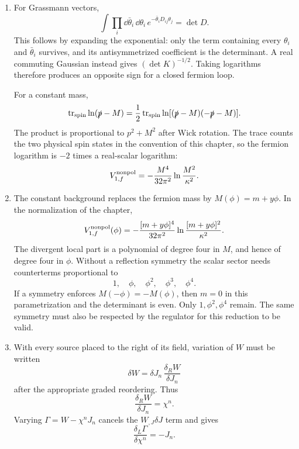 \begin{enumerate}
  \begin{enumerate}
    \item[(a)]
    For Grassmann vectors,
    \[
      \int\prod_i \dd\bar\theta_i\,\dd\theta_i\,
        e^{-\bar\theta_iD_{ij}\theta_j}=\det D.
    \]
    This follows by expanding the exponential: only the term containing
    every \(\theta_i\) and \(\bar\theta_i\) survives, and its antisymmetrized
    coefficient is the determinant.  A real commuting Gaussian instead
    gives \((\det K)^{-1/2}\).  Taking logarithms therefore produces an
    opposite sign for a closed fermion loop.

    For a constant mass,
    \[
      \operatorname{tr}_{\rm spin}\ln(\slashed p-M)
        =\frac12\operatorname{tr}_{\rm spin}
          \ln[(\slashed p-M)(-\slashed p-M)].
    \]
    The product is proportional to \(p^2+M^2\) after Wick rotation.  The
    trace counts the two physical spin states in the convention of this
    chapter, so the fermion logarithm is \(-2\) times a real-scalar
    logarithm:
    \[
      V_{1,f}^{\rm nonpol}
        =-\frac{M^4}{32\pi^2}\ln\frac{M^2}{\kappa^2}.
    \]
    \item[(b)]
    The constant background replaces the fermion mass by
    \(M(\phi)=m+y\phi\).  In the normalization of the chapter,
    \[
      V_{1,f}^{\rm nonpol}(\phi)
        =-\frac{[m+y\phi]^4}{32\pi^2}
          \ln\frac{[m+y\phi]^2}{\kappa^2}.
    \]
    The divergent local part is a polynomial of degree four in \(M\), and
    hence of degree four in \(\phi\).  Without a reflection symmetry the
    scalar sector needs counterterms proportional to
    \[
      1,\quad\phi,\quad\phi^2,\quad\phi^3,\quad\phi^4.
    \]
    If a symmetry enforces \(M(-\phi)=-M(\phi)\), then \(m=0\) in this
    parametrization and the determinant is even.  Only
    \(1,\phi^2,\phi^4\) remain.  The same symmetry must also be respected by
    the regulator for this reduction to be valid.
    \item[(c)]
    With every source placed to the right of its field, variation of \(W\)
    must be written
    \[
      \delta W=\delta J_n\,
        \frac{\delta_R W}{\delta J_n}
    \]
    after the appropriate graded reordering.  Thus
    \[
      \frac{\delta_R W}{\delta J_n}=\chi^n.
    \]
    Varying
    \(\Gamma=W-\chi^nJ_n\) cancels the \(W_{,J}\delta J\) term and gives
    \[
      \frac{\delta_L\Gamma}{\delta\chi^n}=-J_n.
    \]


\end{enumerate}
\end{enumerate}
